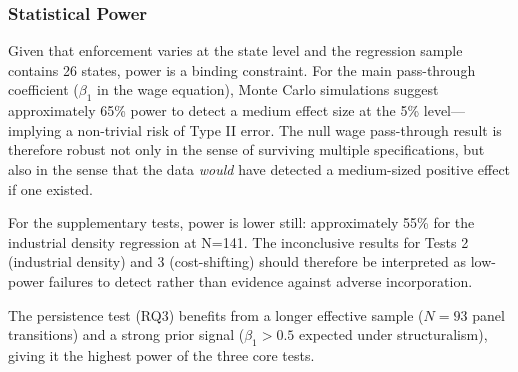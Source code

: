 \subsubsection{Statistical Power}

Given that enforcement varies at the state level and the regression sample contains 26 states, power is a binding constraint. For the main pass-through coefficient ($\beta_1$ in the wage equation), Monte Carlo simulations suggest approximately 65\% power to detect a medium effect size at the 5\% level—implying a non-trivial risk of Type II error. The null wage pass-through result is therefore robust not only in the sense of surviving multiple specifications, but also in the sense that the data \textit{would} have detected a medium-sized positive effect if one existed.

For the supplementary tests, power is lower still: approximately 55\% for the industrial density regression at N=141. The inconclusive results for Tests 2 (industrial density) and 3 (cost-shifting) should therefore be interpreted as low-power failures to detect rather than evidence against adverse incorporation.

The persistence test (RQ3) benefits from a longer effective sample ($N=93$ panel transitions) and a strong prior signal ($\beta_1 > 0.5$ expected under structuralism), giving it the highest power of the three core tests.
